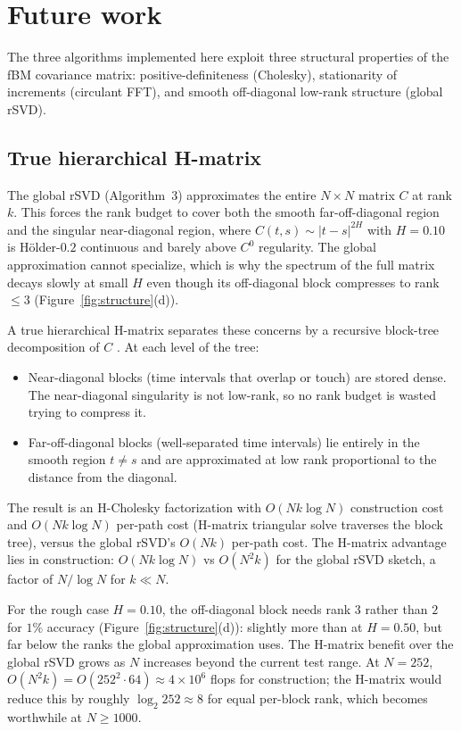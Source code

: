 \section{Future work}
\label{sec:futurework}

The three algorithms implemented here exploit three structural properties of
the fBM covariance matrix: positive-definiteness (Cholesky), stationarity of
increments (circulant FFT), and smooth off-diagonal low-rank structure (global
rSVD).

\subsection{True hierarchical H-matrix}
\label{sec:hmatrix-future}

The global rSVD (Algorithm~3) approximates the entire $N \times N$
matrix $C$ at rank $k$.  This forces the rank budget to cover both the
smooth far-off-diagonal region and the singular near-diagonal region, where
$C(t,s) \sim |t-s|^{2H}$ with $H = 0.10$ is Hölder-$0.2$ continuous and
barely above $C^0$ regularity.  The global approximation cannot specialize, which is
why the spectrum of the full matrix decays slowly at small $H$ even though its
off-diagonal block compresses to rank $\leq 3$ (Figure~\ref{fig:structure}(d)).

A true hierarchical H-matrix separates these concerns by a recursive
block-tree decomposition of $C$ \citep{hackbusch2015hierarchical,
bebendorf2008hierarchical}.  At each level of the tree:
\begin{itemize}
  \item Near-diagonal blocks (time intervals that overlap or touch)
        are stored dense.  The near-diagonal singularity is not low-rank, so
        no rank budget is wasted trying to compress it.
  \item Far-off-diagonal blocks (well-separated time intervals) lie
        entirely in the smooth region $t \neq s$ and are approximated at low
        rank proportional to the distance from the diagonal.
\end{itemize}
The result is an H-Cholesky factorization with $O(Nk\log N)$ construction
cost and $O(Nk\log N)$ per-path cost (H-matrix triangular solve traverses
the block tree), versus the global rSVD's $O(Nk)$ per-path cost.  The
H-matrix advantage lies in construction: $O(Nk\log N)$ vs $O(N^2 k)$ for the
global rSVD sketch, a factor of $N/\log N$ for $k \ll N$.

For the rough case $H = 0.10$, the off-diagonal block needs rank $3$ rather than
$2$ for $1\%$ accuracy (Figure~\ref{fig:structure}(d)): slightly more than at
$H = 0.50$, but far below the ranks the global approximation uses.  The H-matrix
benefit over the global rSVD grows as $N$ increases beyond the current test range.  At $N = 252$,
$O(N^2 k) = O(252^2 \cdot 64) \approx 4 \times 10^6$ flops for construction;
the H-matrix would reduce this by roughly $\log_2 252 \approx 8$ for equal
per-block rank, which becomes worthwhile at $N \geq 1000$.

